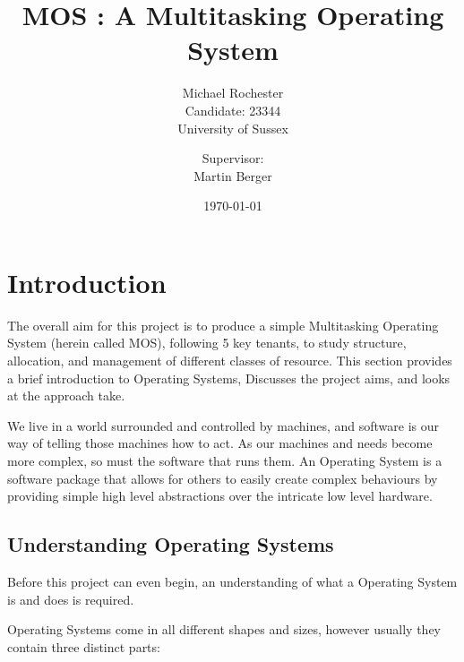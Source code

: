 \documentclass[a4paper]{report}
\title{MOS : A Multitasking Operating System}
\date{\today}
\author{Michael Rochester\\ Candidate: 23344\\ University of Sussex
        \and Supervisor:\\ Martin Berger}
\begin{document}
\titlespacing*{\chapter}{0pt}{-50pt}{20pt}
\titleformat{\chapter}[display]{\normalfont\huge\bfseries}{\chaptertitlename\ \thechapter}{20pt}{\Huge}


\maketitle

\tableofcontents
\listoffigures

\chapter{Introduction}

The overall aim for this project is to produce a simple Multitasking Operating System (herein called MOS), following 5 key tenants, to study structure, allocation, and management of different classes of resource. This section provides a brief introduction to Operating Systems, Discusses the project aims, and looks at the approach take.

We live in a world surrounded and controlled by machines, and software is our way of telling those machines how to act. As our machines and needs become more complex, so must the software that runs them. An Operating System is a software package that allows for others to easily create complex behaviours by providing simple high level abstractions over the intricate low level hardware.

















\clearpage
\section{Understanding Operating Systems}


Before this project can even begin, an understanding of what a Operating System is and does is required.

Operating Systems come in all different shapes and sizes, however usually they contain three distinct parts:
\end{document}
